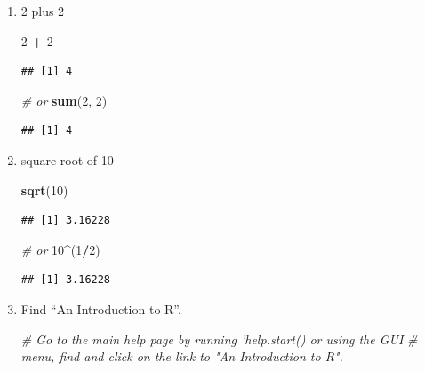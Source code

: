 \documentclass[]{book}
\newenvironment{Shaded}{\begin{snugshade}}{\end{snugshade}}
\newcommand{\KeywordTok}[1]{\textcolor[rgb]{0.13,0.29,0.53}{\textbf{#1}}}
\newcommand{\DecValTok}[1]{\textcolor[rgb]{0.00,0.00,0.81}{#1}}
\newcommand{\StringTok}[1]{\textcolor[rgb]{0.31,0.60,0.02}{#1}}
\newcommand{\CommentTok}[1]{\textcolor[rgb]{0.56,0.35,0.01}{\textit{#1}}}
\newcommand{\OperatorTok}[1]{\textcolor[rgb]{0.81,0.36,0.00}{\textbf{#1}}}
\newcommand{\NormalTok}[1]{#1}
\begin{document}
\begin{enumerate}
\def\labelenumi{\arabic{enumi}.}
\item
  2 plus 2

\begin{Shaded}
\begin{Highlighting}[]
\DecValTok{2} \OperatorTok{+}\StringTok{ }\DecValTok{2}
\end{Highlighting}
\end{Shaded}

\begin{verbatim}
## [1] 4
\end{verbatim}

\begin{Shaded}
\begin{Highlighting}[]
\CommentTok{# or}
\KeywordTok{sum}\NormalTok{(}\DecValTok{2}\NormalTok{, }\DecValTok{2}\NormalTok{)}
\end{Highlighting}
\end{Shaded}

\begin{verbatim}
## [1] 4
\end{verbatim}
\item
  square root of 10

\begin{Shaded}
\begin{Highlighting}[]
\KeywordTok{sqrt}\NormalTok{(}\DecValTok{10}\NormalTok{)}
\end{Highlighting}
\end{Shaded}

\begin{verbatim}
## [1] 3.16228
\end{verbatim}

\begin{Shaded}
\begin{Highlighting}[]
\CommentTok{# or}
\DecValTok{10}\OperatorTok{^}\NormalTok{(}\DecValTok{1}\OperatorTok{/}\DecValTok{2}\NormalTok{)}
\end{Highlighting}
\end{Shaded}

\begin{verbatim}
## [1] 3.16228
\end{verbatim}
\item
  Find ``An Introduction to R''.

\begin{Shaded}
\begin{Highlighting}[]
\CommentTok{# Go to the main help page by running 'help.start() or using the GUI}
\CommentTok{# menu, find and click on the link to "An Introduction to R".}
\end{Highlighting}
\end{Shaded}
\end{enumerate}
\end{document}
